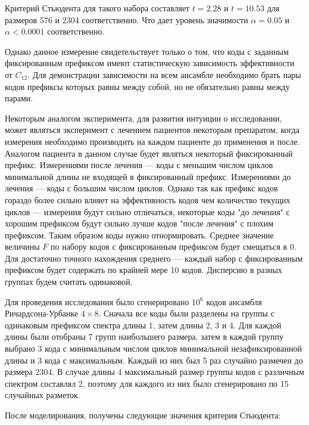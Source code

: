 Критерий Стьюдента для такого набора составляет $t=2.28$ и $t=10.53$ для размеров 576 и 2304 соответственно.
Что дает уровень значимости $\alpha=0.05$ и $\alpha<0.0001$ соответственно.

Однако данное измерение свидетельствует только о том, что коды с заданным фиксированным префиксом
 имеют статистическую зависимость эффективности от $C_{12}$. Для демонстрации зависимости на всем
 ансамбле необходимо брать пары кодов префиксы которых равны между собой, но не обязательно равны
 между парами. 
 
 Некоторым аналогом эксперимента, для развития интуиции о исследовании, может являться эксперимент
 с лечением пациентов некоторым препаратом, когда измерения необходимо производить на каждом пациенте
 до применения и после. Аналогом пациента в данном случае будет являться некоторый фиксированный префикс.
 Измерениями после лечения --- коды с меньшим числом циклов минимальной длины не входящей в фиксированный
 префикс. Измерениями до лечения --- коды с большим числом циклов. Однако так как префикс кодов
 гораздо более сильно влияет на эффективность кодов чем количество текущих циклов --- измерения будут
 сильно отличаться, некоторые коды "до лечения" с хорошим префиксом будут сильно лучше кодов
 "после лечения" с плохим префиксом. Таким образом коды нужно отнормировать. Среднее значение
 величины $F$ по набору кодов с фиксированным префиксом будет смещаться в 0. Для достаточно точного
 нахождения среднего --- каждый набор с фиксированным префиксом будет содержать по крайней мере 10
 кодов. Дисперсию в разных группах будем считать одинаковой.
 
 Для проведения исследования было сгенерировано $10^6$ кодов ансамбля Ричардсона-Урбанке $4 \times 8$.
 Сначала все коды были разделены на группы с одинаковым префиксом спектра длины 1, затем длины 2, 3 и 4.
 Для каждой длины были отобраны 7 групп наибольшего размера, затем в каждой группу выбрано 3 кода с минимальным
 числом циклов минимальной незафиксированной длины и 3 кода с максимальным. Каждый из них
 был 5 раз случайно размечен до размера 2304. В случае длины 4 максимальный размер группы кодов 
 с различным спектром составлял 2, поэтому для каждого из них было сгенерировано по 15 случайных разметок. 

После моделирования, получены следующие значения критерия Стьюдента:

